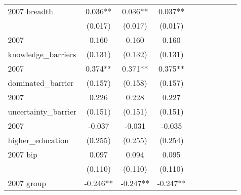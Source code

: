 \begin{table}[htbp]
\begin{tabular}{l*{9}{c}}
2007 breadth        &       0.036** &       0.036** &       0.037** &               &               &               &               &               &               \\
                    &     (0.017)   &     (0.017)   &     (0.017)   &               &               &               &               &               &               \\
2007                &       0.160   &       0.160   &       0.160   &               &               &               &               &               &               \\
knowledge\_barriers  &     (0.131)   &     (0.132)   &     (0.131)   &               &               &               &               &               &               \\
2007                &       0.374** &       0.371** &       0.375** &               &               &               &               &               &               \\
dominated\_barrier   &     (0.157)   &     (0.158)   &     (0.157)   &               &               &               &               &               &               \\
2007                &       0.226   &       0.228   &       0.227   &               &               &               &               &               &               \\
uncertainty\_barrier &     (0.151)   &     (0.151)   &     (0.151)   &               &               &               &               &               &               \\
2007                &      -0.037   &      -0.031   &      -0.035   &               &               &               &               &               &               \\
higher\_education    &     (0.255)   &     (0.255)   &     (0.254)   &               &               &               &               &               &               \\
2007 bip            &       0.097   &       0.094   &       0.095   &               &               &               &               &               &               \\
                    &     (0.110)   &     (0.110)   &     (0.110)   &               &               &               &               &               &               \\
2007 group          &      -0.246** &      -0.247** &      -0.247** &               &               &               &               &               &               \\

\end{tabular}
\end{table}
